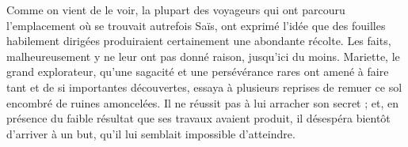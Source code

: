 \documentclass[a4paper, 11pt, oneside]{article}
\begin{document}
Comme on vient de le voir, la plupart des voyageurs qui ont parcouru l'emplacement où se trouvait autrefois Saïs, ont exprimé l'idée que des fouilles habilement dirigées produiraient certainement une abondante récolte. Les faits, malheureusement y ne leur ont pas donné raison, jusqu'ici du moins. Mariette, le grand explorateur, qu'une sagacité et une persévérance rares ont amené à faire tant et de si importantes découvertes, essaya à plusieurs reprises de remuer ce sol encombré de ruines amoncelées. Il ne réussit pas à lui arracher son secret ; et, en présence du faible résultat que ses travaux avaient produit, il désespéra bientôt d'arriver à un but, qu'il lui semblait impossible d'atteindre.
\clearpage
\ClearShipoutPictureBG
{}
\vspace*{\fill}
\end{document}

